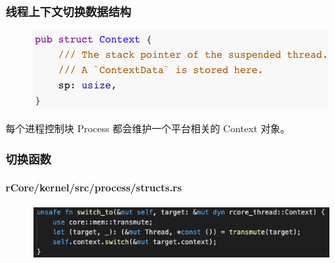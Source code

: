 \begin{frame}[fragile]
    \frametitle{线程上下文切换数据结构}
    \begin{figure}
    \includegraphics[width=0.9\linewidth]{figs/struct-Context.png}
    \end{figure}

每个进程控制块 Process 都会维护一个平台相关的 Context 对象。

\end{frame}

% 
% 
% 
\begin{frame}[fragile]
    \frametitle{切换函数}
    \framesubtitle{rCore/kernel/src/process/structs.rs}
    \begin{figure}
    \includegraphics[width=1.0\linewidth]{figs/switch-to.png}
    \end{figure}
\end{frame}

